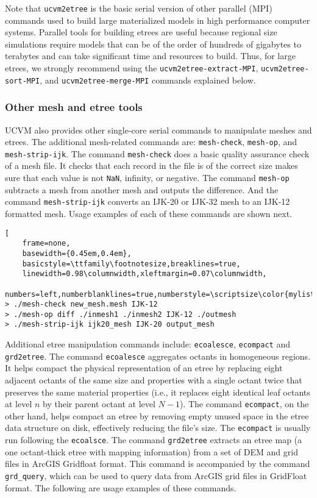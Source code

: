 Note that \texttt{ucvm2etree} is the basic serial version of other parallel (MPI) commands used to build large materialized models in high performance computer systems. Parallel tools for building etrees are useful because regional size simulations require models that can be of the order of hundreds of gigabytes to terabytes and can take significant time and resources to build. Thus, for large etrees, we strongly recommend using the \texttt{ucvm2etree-extract-MPI}, \texttt{ucvm2etree-sort-MPI}, and \texttt{ucvm2etree-merge-MPI} commands explained below.

\subsubsection{Other mesh and etree tools}

UCVM also provides other single-core serial commands to manipulate meshes and etrees. The additional mesh-related commands are: \texttt{mesh-check}, \texttt{mesh-op}, and \texttt{mesh-strip-ijk}. The command \texttt{mesh-check} does a basic quality assurance check of a mesh file. It checks that each record in the file is of the correct size makes sure that each value is not \texttt{NaN}, infinity, or negative. The command \texttt{mesh-op} subtracts a mesh from another mesh and outputs the difference. And the command \texttt{mesh-strip-ijk} converts an IJK-20 or IJK-32 mesh to an IJK-12 formatted mesh. Usage examples of each of these commands are shown next.

\begin{lstlisting}[
	frame=none,
	basewidth={0.45em,0.4em},
	basicstyle=\ttfamily\footnotesize,breaklines=true,
	linewidth=0.98\columnwidth,xleftmargin=0.07\columnwidth,
	numbers=left,numberblanklines=true,numberstyle=\scriptsize\color{mylistingnclr}]
> ./mesh-check new_mesh.mesh IJK-12
> ./mesh-op diff ./inmesh1 ./inmesh2 IJK-12 ./outmesh
> ./mesh-strip-ijk ijk20_mesh IJK-20 output_mesh
\end{lstlisting}

Additional etree manipulation commands include: \texttt{ecoalesce}, \texttt{ecompact} and \texttt{grd2etree}. The command \texttt{ecoalesce} aggregates octants in homogeneous regions. It helps compact the physical representation of an etree by replacing eight adjacent octants of the same size and properties with a single octant twice that preserves the same material properties (i.e., it replaces eight identical leaf octants at level $n$ by their parent octant at level $N-1$). The command \texttt{ecompact}, on the other hand, helps compact an etree by removing empty unused space in the etree data structure on disk, effectively reducing the file's size. The \texttt{ecompact} is usually run following the \texttt{ecoalsce}. The command \texttt{grd2etree} extracts an etree map (a one octant-thick etree with mapping information) from a set of DEM and \vsthirty{} grid files in ArcGIS Gridfloat format. This command is accompanied by the command \texttt{grd\_query}, which can be used to query data from ArcGIS grid files in GridFloat format. The following are usage examples of these commands.

